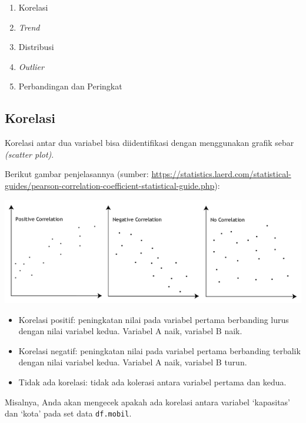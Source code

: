 \documentclass[openany]{book}
\newenvironment{Shaded}{\begin{snugshade}}{\end{snugshade}}
\newcommand{\KeywordTok}[1]{\textcolor[rgb]{0.13,0.29,0.53}{\textbf{#1}}}
\newcommand{\DataTypeTok}[1]{\textcolor[rgb]{0.13,0.29,0.53}{#1}}
\newcommand{\StringTok}[1]{\textcolor[rgb]{0.31,0.60,0.02}{#1}}
\newcommand{\CommentTok}[1]{\textcolor[rgb]{0.56,0.35,0.01}{\textit{#1}}}
\newcommand{\OperatorTok}[1]{\textcolor[rgb]{0.81,0.36,0.00}{\textbf{#1}}}
\newcommand{\NormalTok}[1]{#1}
\providecommand{\tightlist}{%
  \setlength{\itemsep}{0pt}\setlength{\parskip}{0pt}}
\begin{document}
\begin{enumerate}
\def\labelenumi{\arabic{enumi}.}
\tightlist
\item
  Korelasi
\item
  \emph{Trend}
\item
  Distribusi
\item
  \emph{Outlier}
\item
  Perbandingan dan Peringkat
\end{enumerate}

\subsection{Korelasi}\label{korelasi}

Korelasi antar dua variabel bisa diidentifikasi dengan menggunakan
grafik sebar \emph{(scatter plot)}.

Berikut gambar penjelasannya (sumber:
\url{https://statistics.laerd.com/statistical-guides/pearson-correlation-coefficient-statistical-guide.php}):

\includegraphics[width=1\linewidth]{images/pearson-1-small}

\begin{itemize}
\tightlist
\item
  Korelasi positif: peningkatan nilai pada variabel pertama berbanding
  lurus dengan nilai variabel kedua. Variabel A naik, variabel B naik.
\item
  Korelasi negatif: peningkatan nilai pada variabel pertama berbanding
  terbalik dengan nilai variabel kedua. Variabel A naik, variabel B
  turun.
\item
  Tidak ada korelasi: tidak ada kolerasi antara variabel pertama dan
  kedua.
\end{itemize}

Misalnya, Anda akan mengecek apakah ada korelasi antara variabel
`kapasitas' dan `kota' pada set data \texttt{df.mobil}.

\begin{Shaded}
\end{Shaded}
\end{document}
